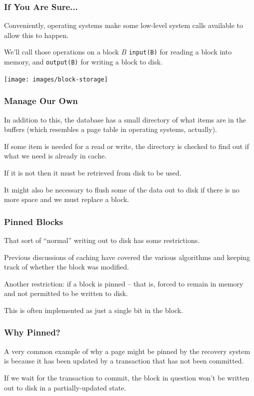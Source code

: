 \begin{frame}
\frametitle{If You Are Sure...}


Conveniently, operating systems make some low-level system calls available to allow this to happen.

 We'll call those operations on a block $B$ \texttt{input(B)} for reading a block into memory, and \texttt{output(B)} for writing a block to disk. 

\begin{center}
	\texttt{[image: images/block-storage]}
\end{center}


\end{frame}


\begin{frame}
\frametitle{Manage Our Own}

In addition to this, the database has a small directory of what items are in the buffers (which resembles a page table in operating systems, actually). 

If some item is needed for a read or write, the directory is checked to find out if what we need is already in cache. 

If it is not then it must be retrieved from disk to be used. 

It might also be necessary to flush some of the data out to disk if there is no more space and we must replace a block.

\end{frame}

\begin{frame}
\frametitle{Pinned Blocks}

That sort of ``normal'' writing out to disk has some restrictions. 

Previous discussions of caching have covered the various algorithms and keeping track of whether the block was modified. 


Another restriction: if a block is \alert{pinned} -- that is, forced to remain in memory and not permitted to be written to disk. 

This is often implemented as just a single bit in the block.
\end{frame}

\begin{frame}
\frametitle{Why Pinned?}

A very common example of why a page might be pinned by the recovery system is because it has been updated by a transaction that has not been committed.

If we wait for the transaction to commit, the block in question won't be written out to disk in a partially-updated state.

\end{frame}

